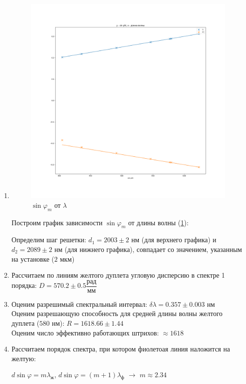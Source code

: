 \documentclass[a4paper, 12pt]{article}
\renewcommand{\phi}{\varphi}
\begin{document}
\begin{enumerate}
    \item 

    \begin{figure}[!h]
        \includegraphics[scale = 0.4]{graph1.png}
        \centering
        \caption{$\sin \phi_m$ от $\lambda$}
        \label{graph1}
    \end{figure}

    Построим график зависимости $\sin \phi_m$ от длины волны (\ref{graph1}):

    Определим шаг решетки: $d_1 = 2003 \pm 2$ нм (для верхнего графика) и $d_2 = 2089 \pm 2$ нм (для нижнего графика), совпадает со значением, указанным на установке ($2$ мкм)

    \item Рассчитаем по линиям желтого дуплета угловую дисперсию в спектре 1 порядка: $D = 570.2 \pm 0.5 \dfrac{\text{рад}}{\text{мм}}$ 
    
    \item Оценим разрешимый спектральный интервал: $\delta \lambda = 0.357 \pm 0.003$ нм\\
    
    Оценим разрешающую способность для средней длины волны желтого дуплета ($580$ нм): $R = 1618.66 \pm 1.44$ \\

    Оценим число эффективно работающих штрихов: $\approx 1618$

    \item Рассчитаем порядок спектра, при котором фиолетоая линия наложится на желтую:
    
    $d \sin \phi = m \lambda_ж$, $d \sin \phi = (m + 1) \lambda_ф$ $\rightarrow$ $m \approx 2.34$
\end{enumerate}
\end{document}
